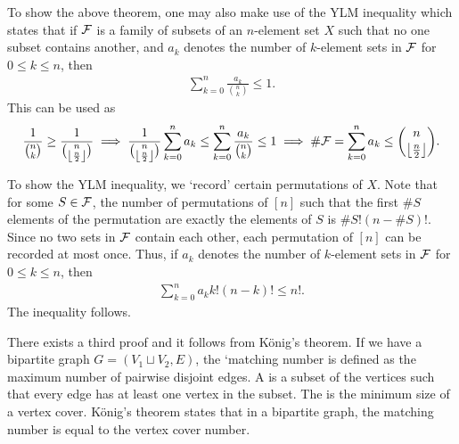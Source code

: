 To show the above theorem, one may also make use of the YLM inequality which states that if $\mathcal{F}$ is a family of subsets of an $n$-element set $X$ such that no one subset contains another, and $a_{k}$ denotes the number of $k$-element sets in $\mathcal{F}$ for $0 \leq k \leq n$, then
\begin{align}
    \sum_{k=0}^{n} \frac{a_{k}}{\binom{n}{k}} \leq 1.
\end{align}
This can be used as
\begin{align}
    \frac{1}{\binom{n}{k}} \geq \frac{1}{\binom{n}{\left\lfloor \frac{n}{2} \right\rfloor}} \implies \frac{1}{\binom{n}{\left\lfloor \frac{n}{2} \right\rfloor}}\sum_{k=0}^{n} a_{k} \leq \sum_{k=0}^{n} \frac{a_{k}}{\binom{n}{k}} \leq 1 \implies \# \mathcal{F} = \sum_{k=0}^{n} a_{k} \leq \binom{n}{\left\lfloor \frac{n}{2} \right\rfloor}.
\end{align}

To show the YLM inequality, we `record' certain permutations of $X$. Note that for some $S \in \mathcal{F}$, the number of permutations of $[n]$ such that the first $\# S$ elements of the permutation are exactly the elements of $S$ is $\# S! (n-\#S)!$. Since no two sets in $\mathcal{F}$ contain each other, each permutation of $[n]$ can be recorded at most once. Thus, if $a_{k}$ denotes the number of $k$-element sets in $\mathcal{F}$ for $0 \leq k \leq n$, then
\begin{align}
    \sum_{k=0}^{n} a_{k} k!(n-k)! \leq n!.
\end{align}
The inequality follows.

There exists a third proof and it follows from K\"onig's theorem. If we have a bipartite graph $G = (V_{1} \sqcup V_{2},E)$, the \eax`{matching number} is defined as the maximum number of pairwise disjoint edges. A  is a subset of the vertices such that every edge has at least one vertex in the subset. The  is the minimum size of a vertex cover. K\"onig's theorem states that in a bipartite graph, the matching number is equal to the vertex cover number.